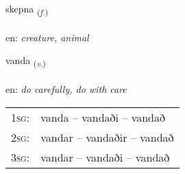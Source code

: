 \documentclass[frontgrid, backgrid]{flacards}\usepackage[]{graphicx}\usepackage[]{xcolor}
\begin{document}
\renewcommand{\blhead}{\vskip5pt {\small\bfseries\footnotesize Nafnorð | Noun }}
\renewcommand{\bcfoot}{\vskip5pt \hspace{2pt}{\small\bfseries\footnotesize 3K}}


{skepna \small{\textsubscript{(\textit{f.})}} \\[1ex] %
\textphonetic{[scɛhpna]} \\
en: \emph{creature, animal} \\  [2ex]
\renewcommand*{\arraystretch}{0.8}
}

\renewcommand{\flhead}{\vskip5pt \fboxsep=0pt {\small\bfseries\footnotesize Sagnorð | Verb}}
\renewcommand{\fcfoot}{\vskip5pt \fboxsep=0pt \hspace{2pt}{\small\bfseries\footnotesize 3K}}

\renewcommand{\blhead}{\vskip5pt {\small\bfseries\footnotesize Sagnorð | Verb }}
\renewcommand{\bcfoot}{\vskip5pt \hspace{2pt}{\small\bfseries\footnotesize 3K}}


{vanda \small{\textsubscript{(\textit{v.})}} \\[1ex] %
\textphonetic{[vanta]} \\
en: \emph{do carefully, do with care} \\  [2ex]
\renewcommand*{\arraystretch}{0.8}
\begin{tabular}{p{1cm}l}
\textsc{1sg}: & vanda -- vandaði -- vandað \\ 
\textsc{2sg}: & vandar -- vandaðir -- vandað \\ 
\textsc{3sg}: & vandar -- vandaði -- vandað \\ 
\end{tabular}
}
\end{document}
